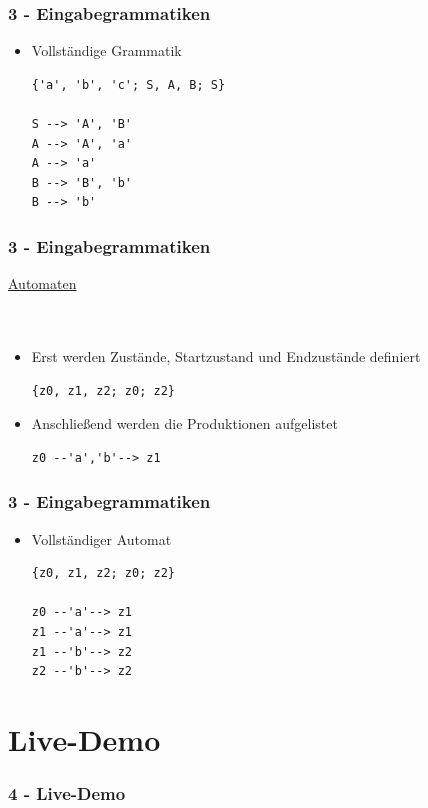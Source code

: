 \documentclass[9pt, xcolor={dvipsnames}]{beamer}
\begin{document}
\begin{frame}[fragile]\frametitle{3 - Eingabegrammatiken}
		\begin{itemize}
		\item Vollständige Grammatik
		\begin{lstlisting}[frame=single]
{'a', 'b', 'c'; S, A, B; S}

S --> 'A', 'B'
A --> 'A', 'a'
A --> 'a'
B --> 'B', 'b'
B --> 'b'
	    \end{lstlisting}
		\end{itemize}
\end{frame}

\begin{frame}[fragile]\frametitle{3 - Eingabegrammatiken}
	{ \fontsize{20}{20} \selectfont \underline{Automaten}}
	\ \\
	\ \\
	\ \\
	\pause
	\begin{itemize}
		\item Erst werden Zustände, Startzustand und Endzustände definiert
		\begin{lstlisting}[frame=single]
{z0, z1, z2; z0; z2}
		\end{lstlisting}
		\pause
		\item Anschließend werden die Produktionen aufgelistet
		\begin{lstlisting}[frame=single]
z0 --'a','b'--> z1
		\end{lstlisting}    
	\end{itemize}
\end{frame}

\begin{frame}[fragile]\frametitle{3 - Eingabegrammatiken}
	\begin{itemize}
		\item Vollständiger Automat
		\begin{lstlisting}[frame=single]
{z0, z1, z2; z0; z2}

z0 --'a'--> z1
z1 --'a'--> z1
z1 --'b'--> z2
z2 --'b'--> z2
		\end{lstlisting}
	\end{itemize}
\end{frame}

\section{Live-Demo}
\begin{frame}\frametitle{4 - Live-Demo}
\end{frame}
\end{document}
